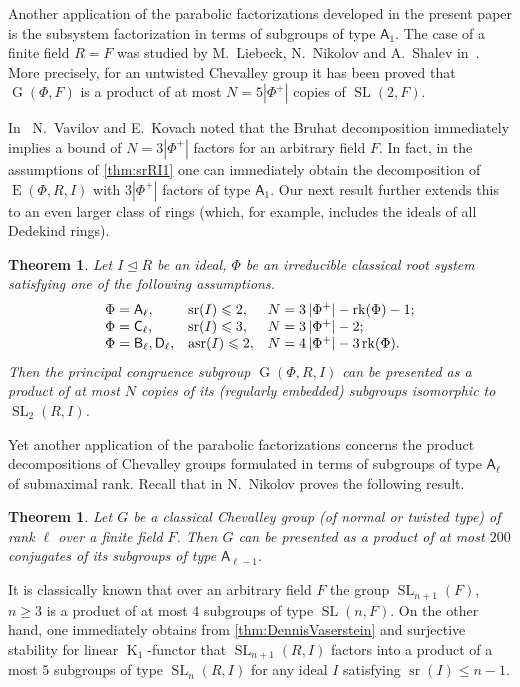 \documentclass[oneside, 12pt]{amsart}
\theoremstyle{plain}
\newtheorem{thm}{Theorem}
\numberwithin{equation}{section}
\numberwithin{lemma}{section}
\newtheorem*{thm*}{Theorem}
\theoremstyle{definition}
\theoremstyle{remark}
\DeclareMathOperator{\K}{K}
\DeclareMathOperator{\G}{G}
\DeclareMathOperator{\SL}{SL}
\DeclareMathOperator{\E}{E}
\DeclareMathOperator{\sr}{sr}
\DeclareMathOperator{\asr}{asr}
\DeclareMathOperator{\rk}{rk}
\newcommand{\rA}{\mathsf{A}}
\newcommand{\rB}{\mathsf{B}}
\newcommand{\rC}{\mathsf{C}}
\newcommand{\rD}{\mathsf{D}}
\begin{document}
Another application of the parabolic factorizations developed in the present paper is the subsystem factorization in terms of subgroups of type $\rA_1$.
The case of a finite field $R=F$ was studied by M.~Liebeck, N.~Nikolov and A.~Shalev in~\cite{LNS11}.
More precisely, for an untwisted Chevalley group it has been proved that $\G(\Phi, F)$ is a product of at most $N=5|\Phi^+|$ copies of $\SL(2, F)$.

In~\cite{V13} N.~Vavilov and E.~Kovach noted that the Bruhat decomposition immediately implies a bound of $N=3|\Phi^+|$ factors for an arbitrary field $F$.
In fact, in the assumptions of \cref{thm:srRI1} one can immediately obtain the decomposition of $\E(\Phi, R, I)$ with $3|\Phi^+|$ factors of type $\rA_1$.
Our next result further extends this to an even larger class of rings (which, for example, includes the ideals of all Dedekind rings).
\begin{thm}\label{thm:SL2width}
Let $I\trianglelefteq R$ be an ideal, $\Phi$ be an irreducible classical root system satisfying one of the following assumptions.
\[\begin{array}{l@{\quad}l@{\quad}l}
\Phi=\rA_\ell, & \sr(I)\leqslant 2, & N=3\left|\Phi^+\right| - \rk(\Phi) - 1; \\
\Phi=\rC_\ell, & \sr(I)\leqslant 3, & N=3\left|\Phi^+\right| - 2; \\
\Phi=\rB_\ell, \rD_\ell, & \asr(I)\leqslant 2, & N=4\left|\Phi^+\right| - 3\rk(\Phi).
\end{array}\]
Then the principal congruence subgroup $\G(\Phi, R, I)$ can be presented as a product of at most $N$ copies of its (regularly embedded) subgroups isomorphic to $\SL_2(R, I)$.
\end{thm}

Yet another application of the parabolic factorizations concerns the product decompositions of Chevalley groups formulated in terms of subgroups of type $\rA_\ell$ of submaximal rank.
Recall that in \cite{Nik07} N.~Nikolov proves the following result. 
\begin{thm*} Let $G$ be a classical Chevalley group (of normal or twisted type) of rank $\ell$ over a finite field $F$.
Then $G$ can be presented as a product of at most $200$ conjugates of its subgroups of type $\rA_{\ell-1}$. \end{thm*}

It is classically known that over an arbitrary field $F$ the group $\SL_{n+1}(F)$, $n\geq 3$ is a product of at most $4$ subgroups of type $\SL(n, F)$.
On the other hand, one immediately obtains from \cref{thm:DennisVaserstein} and surjective stability for linear $\K_1$-functor that $\SL_{n+1}(R, I)$ factors into a product
of a most $5$ subgroups of type $\SL_n(R, I)$ for any ideal $I$ satisfying $\sr(I)\leqslant n-1$.
\end{document}
